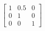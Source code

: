 \documentclass[preview]{standalone}
\begin{document}
\begin{align*}
\begin{bmatrix} 1 & 0.5 & 0 \\ 0 & 1 & 0 \\ 0 & 0 & 1\end{bmatrix}
\end{align*}
\end{document}

